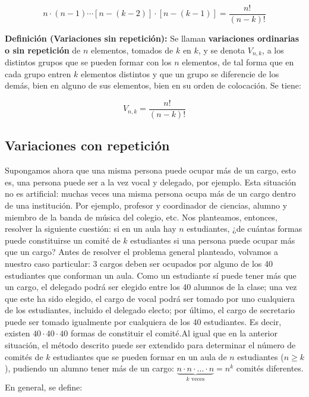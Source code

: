 \documentclass[12pt]{article}
\theoremstyle{definition}
\theoremstyle{plain}
\theoremstyle{plain}
\theoremstyle{definition}
\begin{document}
            \begin{equation*}
                n \cdot (n-1) \cdots [n-(k-2)] \cdot [n-(k-1)] = \frac{n!}{(n-k)!}
            \end{equation*}

            \textbf{Definición (Variaciones sin repetición):}
            Se llaman \textbf{variaciones ordinarias o sin repetición} de \(n\) elementos, tomados de \(k\) en \(k\), y se denota \(V_{n,k}\), a los distintos grupos que se pueden formar con los \(n\) elementos,
            de tal forma que en cada grupo entren \(k\) elementos distintos y que un grupo se diferencie de los demás, bien en alguno de sus elementos, bien en su orden de colocación. Se tiene:

            \begin{equation*}
                V_{n,k} = \frac{n!}{(n-k)!}
            \end{equation*}

    \subsection{Variaciones con repetición}

        Supongamos ahora que una misma persona puede ocupar más de un cargo, esto es, una persona puede ser a la vez vocal y delegado, por ejemplo. Esta situación no es artificial: muchas veces una misma persona ocupa más de un cargo dentro de una institución. Por ejemplo, profesor y coordinador de ciencias, alumno y miembro de la banda de música del colegio, etc. Nos planteamos, entonces, resolver la siguiente cuestión: si en un aula hay $n$ estudiantes, ¿de cuántas formas puede constituirse un comité de $k$ estudiantes si una persona puede ocupar más que un cargo? Antes de resolver el problema general planteado, volvamos a nuestro caso particular: 3 cargos deben ser ocupados por alguno de los 40 estudiantes que conforman un aula. Como un estudiante sí puede tener más que un cargo, el delegado podrá ser elegido entre los 40 alumnos de la clase; una vez que este ha sido elegido, el cargo de vocal podrá ser tomado por uno cualquiera de los estudiantes, incluido el delegado electo; por último, el cargo de secretario puede ser tomado igualmente por cualquiera de los 40 estudiantes. Es decir, existen $40 \cdot 40 \cdot 40$ formas de constituir el comité.Al igual que en la anterior situación, el método descrito puede ser extendido para determinar el número de comités de $k$ estudiantes que se pueden formar en un aula de $n$ estudiantes ($n \geq k$), pudiendo un alumno tener más de un cargo: $\underbrace{n \cdot n \cdot \ldots \cdot n}_{k \text{ veces}} = n^k$ comités diferentes. En general, se define:
        
\end{document}
